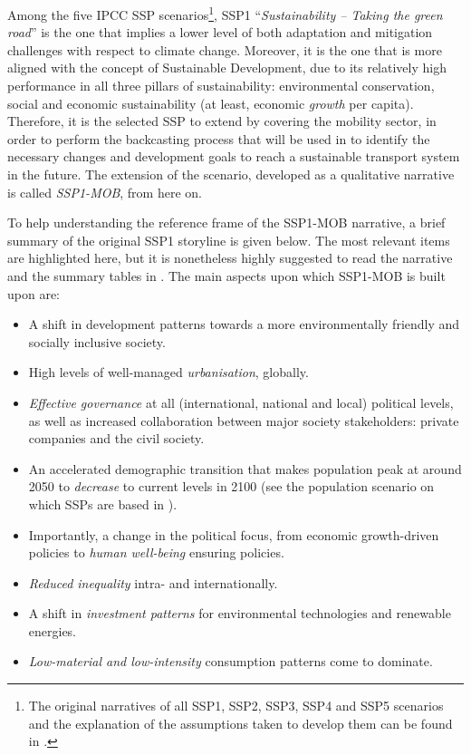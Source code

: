 Among the five IPCC \gls{SSP} scenarios\footnote{The original narratives of all SSP1, SSP2, SSP3, SSP4 and SSP5 scenarios and the explanation of the assumptions taken to develop them can be found in \textcite{oneill2017_roadsaheadNarratives}.}, SSP1 ``\textit{Sustainability -- Taking the green road}'' is the one that implies a lower level of both adaptation and mitigation challenges with respect to climate change. Moreover, it is the one that is more aligned with the concept of Sustainable Development, due to its relatively high performance in all three pillars of sustainability: environmental conservation, social and economic sustainability (at least, economic \emph{growth} per capita). Therefore, it is the selected SSP to extend by covering the mobility sector, in order to perform the backcasting process that will be used in  to identify the necessary changes and development goals to reach a sustainable transport system in the future. The extension of the scenario, developed as a qualitative narrative is called \emph{SSP1-MOB}, from here on.

To help understanding the reference frame of the SSP1-MOB narrative, a brief summary of the original SSP1 storyline is given below. The most relevant items are highlighted here, but it is nonetheless highly suggested to read the narrative and the summary tables in \textcite{oneill2017_roadsaheadNarratives}. The main aspects upon which SSP1-MOB is built upon are:
%
\begin{itemize}
\item A shift in development patterns towards a more environmentally friendly and socially inclusive society.
\item High levels of well-managed \emph{urbanisation}, globally.
\item \emph{Effective governance} at all (international, national and local) political levels, as well as increased collaboration between major society stakeholders: private companies and the civil society.
\item An accelerated demographic transition that makes population peak at around 2050 to \emph{decrease} to current levels in 2100 (see the population scenario on which SSPs are based in \textcite{kc2017_humancoreshared}).
\item Importantly, a change in the political focus, from economic growth-driven policies to \emph{human well-being} ensuring policies.
\item \emph{Reduced inequality} intra- and internationally.
\item A shift in \emph{investment patterns} for environmental technologies and renewable energies.
\item \emph{Low-material and low-intensity} consumption patterns come to dominate.
\end{itemize}

